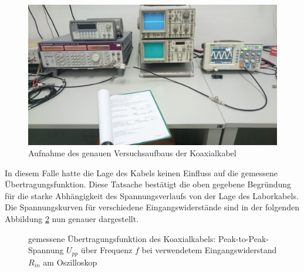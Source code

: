 		\begin{figure}[H]
			\center
			\includegraphics[scale = 0.09]{messwerte/DSC_0552.JPG}
			\caption{\centering Aufnahme des genauen Versuchsaufbaus der Koaxialkabel} %
			\label{versuchsaufbau_koaxialkabel}
		\end{figure}

		In diesem Falle hatte die Lage des Kabels keinen Einfluss auf die gemessene Übertragungsfunktion.
		Diese Tatsache bestätigt die oben gegebene Begründung für die starke Abhängigkeit des Spannungsverlaufs von der Lage des Laborkabels.
		Die Spannungskurven für verschiedene Eingangswiderstände sind in der folgenden Abbildung \ref{diagramm_koaxkabel} nun genauer dargestellt.

		\begin{figure}[H]
			\center
			
			\caption{\centering gemessene Übertragungsfunktion des Koaxialkabels: Peak-to-Peak-Spannung $U_{pp}$ über Frequenz $f$ bei verwendetem Eingangswiderstand $R_{in}$ am Oszilloskop} %
			\label{diagramm_koaxkabel}
		\end{figure}


